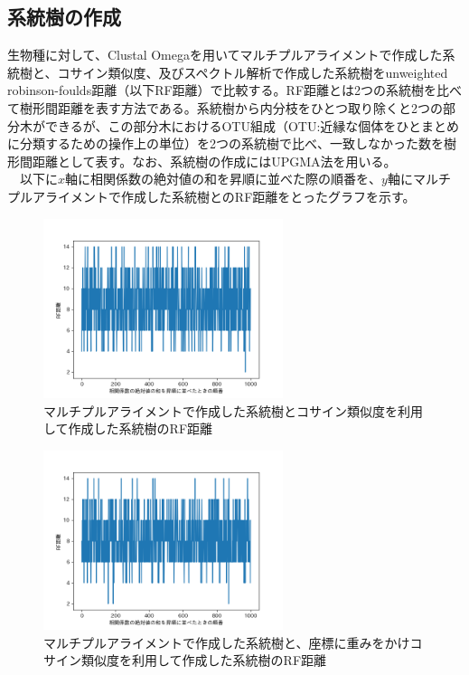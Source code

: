 \documentclass[twocolumn,paper=a4paper,landscape,fontsize=9pt]{jlreq}
\begin{document}
\subsection{系統樹の作成}
生物種に対して、Clustal Omegaを用いてマルチプルアライメントで作成した系統樹と、コサイン類似度、及びスペクトル解析で作成した系統樹をunweighted robinson-foulds距離（以下RF距離）で比較する。RF距離とは2つの系統樹を比べて樹形間距離を表す方法である。系統樹から内分枝をひとつ取り除くと2つの部分木ができるが、この部分木におけるOTU組成（OTU:近縁な個体をひとまとめに分類するための操作上の単位）を2つの系統樹で比べ、一致しなかった数を樹形間距離として表す。なお、系統樹の作成にはUPGMA法を用いる。\\
　以下に$x$軸に相関係数の絶対値の和を昇順に並べた際の順番を、$y$軸にマルチプルアライメントで作成した系統樹とのRF距離をとったグラフを示す。

\begin{figure}[H]
  \centering
  \includegraphics[width=70mm]{pca_treelist.png}
  \caption{マルチプルアライメントで作成した系統樹とコサイン類似度を利用して作成した系統樹のRF距離}
\end{figure}

\begin{figure}[H]
  \centering
  \includegraphics[width=70mm]{pca_treelist_o.png}
  \caption{マルチプルアライメントで作成した系統樹と、座標に重みをかけコサイン類似度を利用して作成した系統樹のRF距離}
\end{figure}
\end{document}
